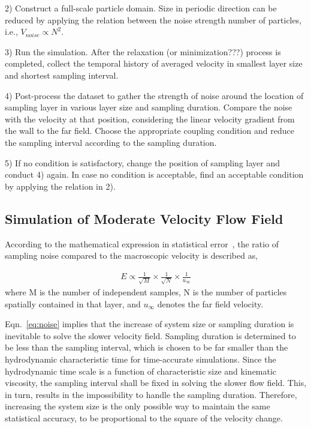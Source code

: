 \documentclass[preprint,12pt]{elsarticle}
\begin{document}
2) Construct a full-scale particle domain. Size in periodic direction can be reduced by applying the relation between the noise strength number of particles, i.e., $V_{noise} \propto N^2$.

3) Run the simulation. After the relaxation (or minimization???) process is completed, collect the temporal history of averaged velocity in smallest layer size and shortest sampling interval. 

4) Post-process the dataset to gather the strength of noise around the location of sampling layer in various layer size and sampling duration. Compare the noise with the velocity at that position, considering the linear velocity gradient from the wall to the far field. Choose the appropriate coupling condition and reduce the sampling interval according to the sampling duration.

5) If no condition is satisfactory, change the position of sampling layer and conduct 4) again. In case no condition is acceptable, find an acceptable condition by applying the relation in 2).




\subsection{Simulation of Moderate Velocity Flow Field}
According to the mathematical expression in statistical error~\cite{Hadjicon3,Time_Mechanism}, the ratio of sampling noise compared to the macroscopic velocity is described as,

\vspace{-.2em}
\begin{eqnarray}
E \propto \frac{1}{\sqrt{M}} \times \frac{1}{\sqrt{N}} \times \frac{1}{u_{\infty}}
 \label{eq:noise}
\end{eqnarray}
where M is the number of independent samples, N is the number of particles spatially contained in that layer, and ${u_{\infty}}$ denotes the far field velocity.

Eqn.~\ref{eq:noise} implies that the increase of system size or sampling duration is inevitable to solve the slower velocity field. Sampling duration is determined to be less than the sampling interval, which is chosen to be far smaller than the hydrodynamic characteristic time for time-accurate simulations. Since the hydrodynamic time scale is a function of characteristic size and kinematic viscosity, the sampling interval shall be fixed in solving the slower flow field. This, in turn, results in the impossibility to handle the sampling duration. Therefore, increasing the system size is the only possible way to maintain the same statistical accuracy, to be proportional to the square of the velocity change.
\end{document}

